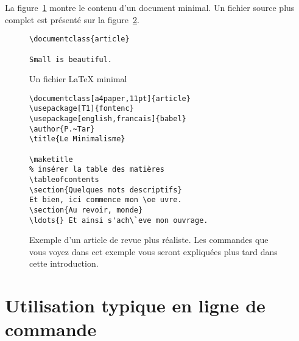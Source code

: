 La figure~\ref{mini} montre le contenu d'un document \LaTeXe{}
minimal. Un fichier source plus complet est présenté sur la
figure~\ref{document}.

\begin{figure}[hbp]
\begin{lined}{6cm}
\begin{verbatim}
\documentclass{article}

Small is beautiful.

\end{verbatim}
\end{lined}
\caption{Un fichier \LaTeX{} minimal} \label{mini}
\end{figure}

\begin{figure}[htbp]
\begin{lined}{10cm}
\begin{verbatim}
\documentclass[a4paper,11pt]{article}
\usepackage[T1]{fontenc}
\usepackage[english,francais]{babel}
\author{P.~Tar}
\title{Le Minimalisme}

\maketitle
% insérer la table des matières
\tableofcontents
\section{Quelques mots descriptifs}
Et bien, ici commence mon \oe uvre.
\section{Au revoir, monde}
\ldots{} Et ainsi s'ach\`eve mon ouvrage.

\end{verbatim}
\end{lined}
\caption[Exemple d'un article de revue plus réaliste]{Exemple d'un
  article de revue plus réaliste. Les commandes que vous voyez dans
  cet exemple vous seront expliquées plus tard dans cette introduction.} \label{document}
\end{figure}

\section{Utilisation typique en ligne de commande}

